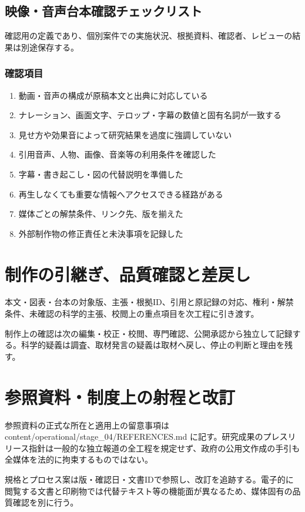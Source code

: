 \documentclass[a4paper,11pt]{article}
\begin{document}
\subsection{映像・音声台本確認チェックリスト}
\par 確認用の定義であり、個別案件での実施状況、根拠資料、確認者、レビューの結果は別途保存する。\par\medskip
\subsubsection*{確認項目}
\begin{enumerate}[leftmargin=2em,itemsep=0.3em]
\item 動画・音声の構成が原稿本文と出典に対応している\par
\item ナレーション、画面文字、テロップ・字幕の数値と固有名詞が一致する\par
\item 見せ方や効果音によって研究結果を過度に強調していない\par
\item 引用音声、人物、画像、音楽等の利用条件を確認した\par
\item 字幕・書き起こし・図の代替説明を準備した\par
\item 再生しなくても重要な情報へアクセスできる経路がある\par
\item 媒体ごとの解禁条件、リンク先、版を揃えた\par
\item 外部制作物の修正責任と未決事項を記録した\par
\end{enumerate}
\section{制作の引継ぎ、品質確認と差戻し}
\par 本文・図表・台本の対象版、主張・根拠ID、引用と原記録の対応、権利・解禁条件、未確認の科学的主張、校閲上の重点項目を次工程に引き渡す。\par\medskip
\par 制作上の確認は次の編集・校正・校閲、専門確認、公開承認から独立して記録する。科学的疑義は調査、取材発言の疑義は取材へ戻し、停止の判断と理由を残す。\par\medskip
\section{参照資料・制度上の射程と改訂}
\par 参照資料の正式な所在と適用上の留意事項は content/operational/stage\_04/REFERENCES.md に記す。研究成果のプレスリリース指針は一般的な独立報道の全工程を規定せず、政府の公用文作成の手引も全媒体を法的に拘束するものではない。\par\medskip
\par 規格とプロセス案は版・確認日・文書IDで参照し、改訂を追跡する。電子的に閲覧する文書と印刷物では代替テキスト等の機能面が異なるため、媒体固有の品質確認を別に行う。\par\medskip
\end{document}
